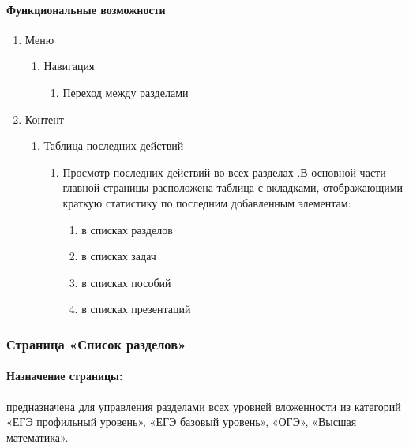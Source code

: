 \paragraph{Функциональные возможности}
\begin{enumerate}
	\item Меню
	\begin{enumerate}
		\item Навигация
		\begin{enumerate}
			\item Переход между разделами
		\end{enumerate}
	\end{enumerate}

	\item Контент
	\begin{enumerate}
		\item Таблица последних действий
		\begin{enumerate}
			\item Просмотр последних действий во всех разделах .В основной части главной страницы расположена таблица с вкладками, отображающими краткую статистику по последним добавленным элементам:
			\begin{enumerate}
				\item  в списках разделов
				\item  в списках задач
				\item  в списках пособий
				\item  в списках презентаций
			\end{enumerate}
		\end{enumerate}
	\end{enumerate}
\end{enumerate}

\subsubsection{Страница «Список разделов»}
\paragraph{Назначение страницы:} предназначена для управления разделами всех уровней вложенности из категорий «ЕГЭ профильный уровень», «ЕГЭ базовый уровень», «ОГЭ», «Высшая математика».

